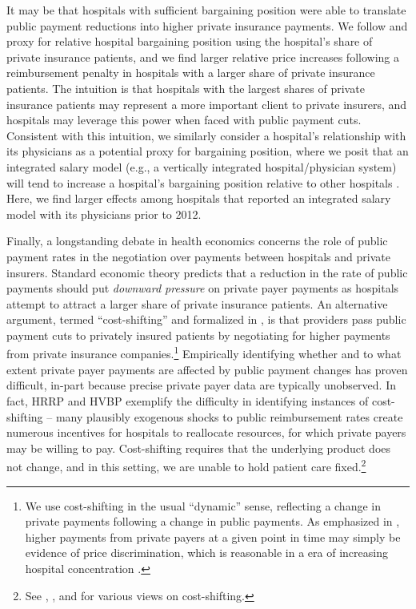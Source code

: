 \documentclass[12pt]{article}
\begin{document}
It may be that hospitals with sufficient bargaining position were able to translate public payment reductions into higher private insurance payments. We follow \cite{wu2010} and proxy for relative hospital bargaining position using the hospital's share of private insurance patients, and we find larger relative price increases following a reimbursement penalty in hospitals with a larger share of private insurance patients.  The intuition is that hospitals with the largest shares of private insurance patients may represent a more important client to private insurers, and hospitals may leverage this power when faced with public payment cuts. Consistent with this intuition, we similarly consider a hospital's relationship with its physicians as a potential proxy for bargaining position, where we posit that an integrated salary model (e.g., a vertically integrated hospital/physician system) will tend to increase a hospital's bargaining position relative to other hospitals \citep{lewis2015}. Here, we find larger effects among hospitals that reported an integrated salary model with its physicians prior to 2012.

Finally, a longstanding debate in health economics concerns the role of public payment rates in the negotiation over payments between hospitals and private insurers.  Standard economic theory predicts that a reduction in the rate of public payments should put \textit{downward pressure} on private payer payments as hospitals attempt to attract a larger share of private insurance patients.  An alternative argument, termed ``cost-shifting'' and formalized in \cite{dranove1988}, is that providers pass public payment cuts to privately insured patients by negotiating for higher payments from private insurance companies.\footnote{We use cost-shifting in the usual ``dynamic'' sense, reflecting a change in private payments following a change in public payments. As emphasized in \cite{hay1983}, higher payments from private payers at a given point in time may simply be evidence of price discrimination, which is reasonable in a era of increasing hospital concentration \citep{gaynor2015jel}.}  Empirically identifying whether and to what extent private payer payments are affected by public payment changes has proven difficult, in-part because precise private payer data are typically unobserved.  In fact, HRRP and HVBP exemplify the difficulty in identifying instances of cost-shifting -- many plausibly exogenous shocks to public reimbursement rates create numerous incentives for hospitals to reallocate resources, for which private payers may be willing to pay.  Cost-shifting requires that the underlying product does not change, and in this setting, we are unable to hold patient care fixed.\footnote{See \cite{dranove2017}, \citet{frakt2011}, and \citep{cutler2000} for various views on cost-shifting.}
\end{document}
